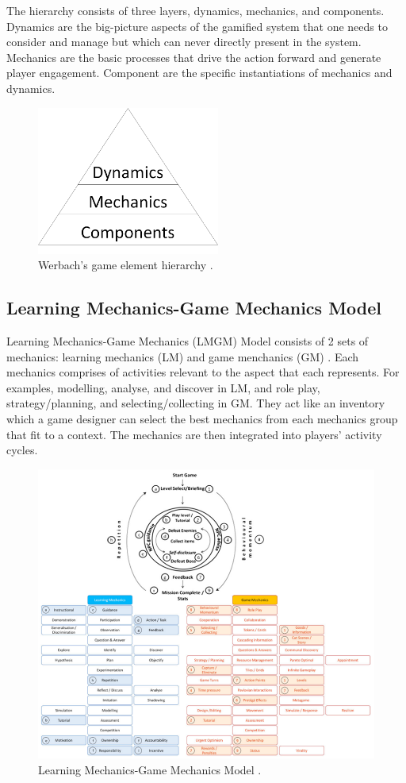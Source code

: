 \documentclass[12pt, a4paper]{report}
\begin{document}
The hierarchy consists of three layers, dynamics, mechanics, and components. Dynamics are the big-picture aspects of the gamified system that one needs to consider and manage but which can never directly present in the system. Mechanics are the basic processes that drive the action forward and generate player engagement. Component are the specific instantiations of mechanics and dynamics. 

\begin{figure}[ht]
\centering
\includegraphics[width=6cm]{werbach}
\caption{Werbach's game element hierarchy \cite{werbach2012win}.}
\label{fig:werbach}
\end{figure}

\subsection{Learning Mechanics-Game Mechanics Model}
Learning Mechanics-Game Mechanics (LMGM) Model consists of 2 sets of mechanics: learning mechanics (LM)  and game menchanics (GM) \cite{arnab2015mapping}. Each mechanics comprises of activities relevant to the aspect that each represents. For examples, modelling, analyse, and discover in LM, and role play, strategy/planning, and selecting/collecting in GM. They act like an inventory which a game designer can select the best mechanics from each mechanics group that fit to a context. The mechanics are then integrated into players' activity cycles.

\begin{figure}[ht]
\centering
\includegraphics[width=12cm]{lmgm}
\caption{Learning Mechanics-Game Mechanics Model \cite{arnab2015mapping}.}
\label{fig:lmgm}
\end{figure}
\end{document}
